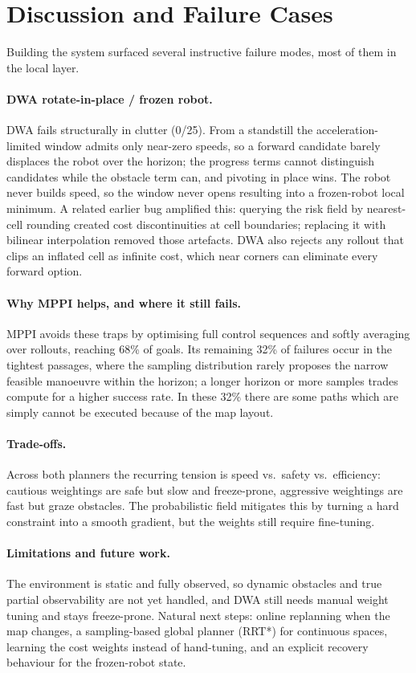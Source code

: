\section{Discussion and Failure Cases}

Building the system surfaced several instructive failure modes, most of them in the local
layer.

\paragraph{DWA rotate-in-place / frozen robot.} DWA fails structurally in clutter (0/25).
From a standstill the acceleration-limited window admits only near-zero speeds, so a
forward candidate barely displaces the robot over the horizon; the progress terms cannot
distinguish candidates while the obstacle term can, and pivoting in place wins. The robot
never builds speed, so the window never opens resulting into a frozen-robot local
minimum. A related earlier bug amplified this: querying the risk field by nearest-cell
rounding created cost discontinuities at cell boundaries; replacing it with bilinear
interpolation removed those artefacts. DWA also rejects any rollout that clips an inflated
cell as infinite cost, which near corners can eliminate every forward option.

\paragraph{Why MPPI helps, and where it still fails.} MPPI avoids these traps by optimising
full control sequences and softly averaging over rollouts, reaching 68\% of goals. Its
remaining 32\% of failures occur in the tightest passages, where the sampling distribution
rarely proposes the narrow feasible manoeuvre within the horizon; a longer horizon or more
samples trades compute for a higher success rate. In these 32\% there are some paths which are simply cannot be executed because of the map layout.

\paragraph{Trade-offs.} Across both planners the recurring tension is speed vs.\ safety
vs.\ efficiency: cautious weightings are safe but slow and freeze-prone, aggressive
weightings are fast but graze obstacles. The probabilistic field mitigates this by turning
a hard constraint into a smooth gradient, but the weights still require fine-tuning.

\paragraph{Limitations and future work.} The environment is static and fully observed, so
dynamic obstacles and true partial observability are not yet handled, and DWA still needs
manual weight tuning and stays freeze-prone. Natural next steps: online replanning when the
map changes, a sampling-based global planner (RRT*) for continuous spaces, learning the cost
weights instead of hand-tuning, and an explicit recovery behaviour for the frozen-robot state.
